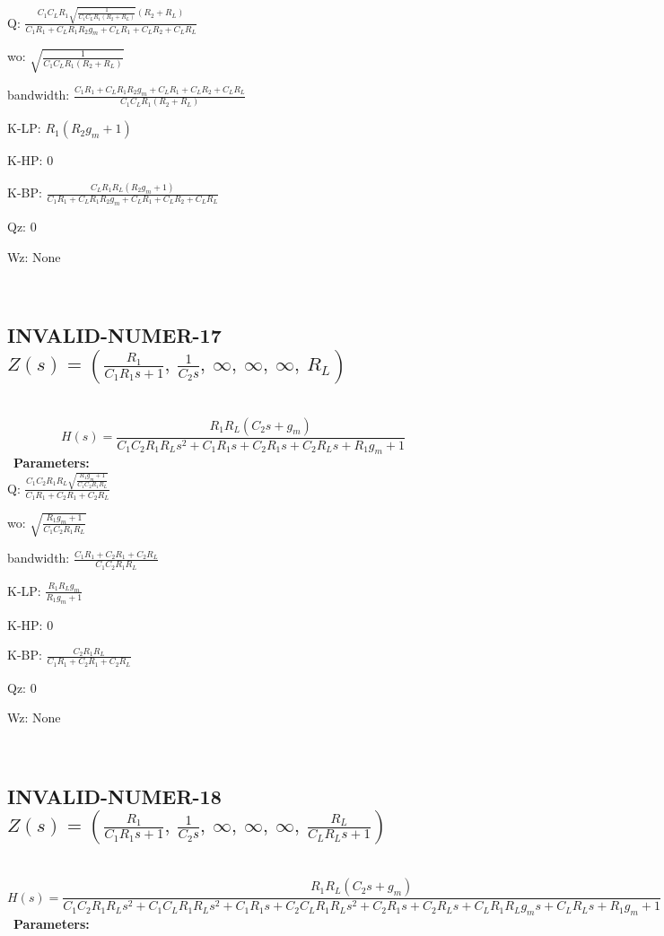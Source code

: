 \documentclass{article}
\begin{document}
Q: $\frac{C_{1} C_{L} R_{1} \sqrt{\frac{1}{C_{1} C_{L} R_{1} \left(R_{2} + R_{L}\right)}} \left(R_{2} + R_{L}\right)}{C_{1} R_{1} + C_{L} R_{1} R_{2} g_{m} + C_{L} R_{1} + C_{L} R_{2} + C_{L} R_{L}}$\ 

wo: $\sqrt{\frac{1}{C_{1} C_{L} R_{1} \left(R_{2} + R_{L}\right)}}$\ 

bandwidth: $\frac{C_{1} R_{1} + C_{L} R_{1} R_{2} g_{m} + C_{L} R_{1} + C_{L} R_{2} + C_{L} R_{L}}{C_{1} C_{L} R_{1} \left(R_{2} + R_{L}\right)}$\ 

K-LP: $R_{1} \left(R_{2} g_{m} + 1\right)$\ 

K-HP: $0$\ 

K-BP: $\frac{C_{L} R_{1} R_{L} \left(R_{2} g_{m} + 1\right)}{C_{1} R_{1} + C_{L} R_{1} R_{2} g_{m} + C_{L} R_{1} + C_{L} R_{2} + C_{L} R_{L}}$\ 

Qz: $0$\ 

Wz: $\text{None}$\ 

\ 

\subsection{INVALID-NUMER-17 $Z(s) = \left( \frac{R_{1}}{C_{1} R_{1} s + 1}, \  \frac{1}{C_{2} s}, \  \infty, \  \infty, \  \infty, \  R_{L}\right)$ } \ 
\textbf{\[H(s) = \frac{R_{1} R_{L} \left(C_{2} s + g_{m}\right)}{C_{1} C_{2} R_{1} R_{L} s^{2} + C_{1} R_{1} s + C_{2} R_{1} s + C_{2} R_{L} s + R_{1} g_{m} + 1}\] } \ 
\textbf{Parameters:}\\ 

Q: $\frac{C_{1} C_{2} R_{1} R_{L} \sqrt{\frac{R_{1} g_{m} + 1}{C_{1} C_{2} R_{1} R_{L}}}}{C_{1} R_{1} + C_{2} R_{1} + C_{2} R_{L}}$\ 

wo: $\sqrt{\frac{R_{1} g_{m} + 1}{C_{1} C_{2} R_{1} R_{L}}}$\ 

bandwidth: $\frac{C_{1} R_{1} + C_{2} R_{1} + C_{2} R_{L}}{C_{1} C_{2} R_{1} R_{L}}$\ 

K-LP: $\frac{R_{1} R_{L} g_{m}}{R_{1} g_{m} + 1}$\ 

K-HP: $0$\ 

K-BP: $\frac{C_{2} R_{1} R_{L}}{C_{1} R_{1} + C_{2} R_{1} + C_{2} R_{L}}$\ 

Qz: $0$\ 

Wz: $\text{None}$\ 

\ 

\subsection{INVALID-NUMER-18 $Z(s) = \left( \frac{R_{1}}{C_{1} R_{1} s + 1}, \  \frac{1}{C_{2} s}, \  \infty, \  \infty, \  \infty, \  \frac{R_{L}}{C_{L} R_{L} s + 1}\right)$ } \ 
\textbf{\[H(s) = \frac{R_{1} R_{L} \left(C_{2} s + g_{m}\right)}{C_{1} C_{2} R_{1} R_{L} s^{2} + C_{1} C_{L} R_{1} R_{L} s^{2} + C_{1} R_{1} s + C_{2} C_{L} R_{1} R_{L} s^{2} + C_{2} R_{1} s + C_{2} R_{L} s + C_{L} R_{1} R_{L} g_{m} s + C_{L} R_{L} s + R_{1} g_{m} + 1}\] } \ 
\textbf{Parameters:}\\ 
\end{document}
